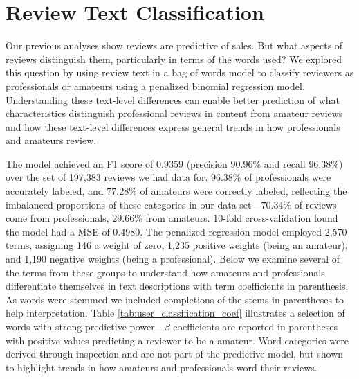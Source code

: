 \documentclass[letterpaper]{article}
\begin{document}


\section{Review Text Classification}
Our previous analyses show reviews are predictive of sales. But what aspects of reviews distinguish them, particularly in terms of the words used? We explored this question by using review text in a bag of words model to classify reviewers as professionals or amateurs using a penalized binomial regression model. Understanding these text-level differences can enable better prediction of what characteristics distinguish professional reviews in content from amateur reviews and how these text-level differences express general trends in how professionals and amateurs review.

The model achieved an F1 score of $0.9359$ (precision $90.96\%$ and recall $96.38\%$) over the set of 197,383 reviews we had data for. $96.38\%$ of professionals were accurately labeled, and $77.28\%$ of amateurs were correctly labeled, reflecting the imbalanced proportions of these categories in our data set---$70.34\%$ of reviews come from professionals, $29.66\%$ from amateurs. 10-fold cross-validation found the model had a MSE of 0.4980. The penalized regression model employed 2,570 terms, assigning 146 a weight of zero, 1,235 positive weights (being an amateur), and 1,190 negative weights (being a professional). Below we examine several of the terms from these groups to understand how amateurs and professionals differentiate themselves in text descriptions with term coefficients in parenthesis. As words were stemmed we included completions of the stems in parentheses to help interpretation. Table \ref{tab:user_classification_coef} illustrates a selection of words with strong predictive power---$\beta$ coefficients are reported in parentheses with positive values predicting a reviewer to be a amateur. Word categories were derived through inspection and are not part of the predictive model, but shown to highlight trends in how amateurs and professionals word their reviews. 
\end{document}
